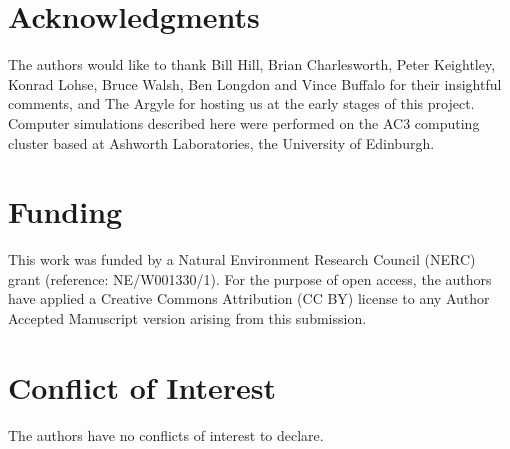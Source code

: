 \documentclass[12pt]{article}
\begin{document}
\begin{bibunit}
\section*{Acknowledgments}

The authors would like to thank Bill Hill, Brian Charlesworth, Peter Keightley, Konrad Lohse, Bruce Walsh, Ben Longdon and Vince Buffalo for their insightful comments, and The Argyle for hosting us at the early stages of this project. Computer simulations described here were performed on the AC3 computing cluster based at Ashworth Laboratories, the University of Edinburgh.

\section*{Funding}
This work was funded by a Natural Environment Research Council (NERC) grant (reference: NE/W001330/1). For the purpose of open access, the authors have applied a Creative Commons Attribution (CC BY) license to any Author Accepted Manuscript version arising from this submission.

\section*{Conflict of Interest}
The authors have no conflicts of interest to declare.

\putbib
\end{bibunit}
\newpage
\end{document}
